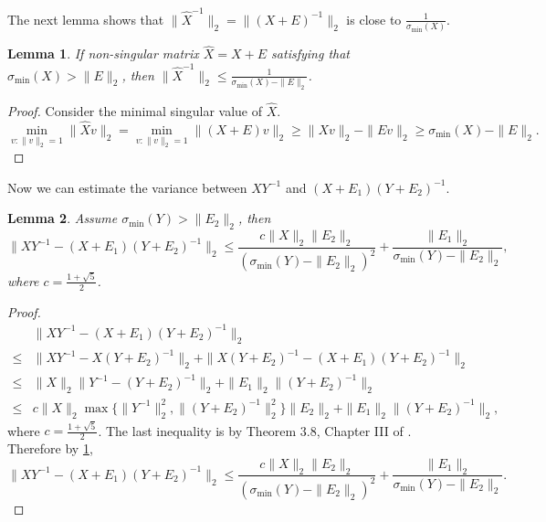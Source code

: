 \documentclass[english]{article} %
\newtheorem{lemma}{Lemma}[section]
\theoremstyle{definition}
\begin{document}
The next lemma shows that $\|\widehat{X}^{-1}\|_2 = \|(X+E)^{-1}\|_2$ is close to $\frac{1}{\sigma_{\min}(X)}$.

\begin{lemma}
\label{lem:inversevariation}
If non-singular matrix $\widehat{X} = X+E$ satisfying that $\sigma_{\min}(X)>\|E\|_2$, then  $\|\widehat{X}^{-1}\|_2 \le \frac{1}{\sigma_{\min}(X)-\|E\|_2}$.
\end{lemma} 
\begin{proof}
Consider the minimal singular value of $\widehat{X}$. 
\[
 \min_{v:\|v\|_2=1} \|\widehat{X}v\|_2 = \min_{v:\|v\|_2=1}\|(X+E)v\|_2 \ge \|Xv\|_2 - \|Ev\|_2 \ge \sigma_{\min}(X) - \|E\|_2.
\]
\end{proof}

Now we can estimate the variance between $XY^{-1}$ and $(X+E_1)(Y+E_2)^{-1}$.
\begin{lemma}
\label{lem:Mvariation}
Assume $\sigma_{\min}(Y) > \|E_2\|_2$, then 
\[
\| XY^{-1} - (X+E_1)(Y+E_2)^{-1}\|_2 \le \frac{c\|X\|_2\|E_2\|_2}{(\sigma_{\min}(Y) - \|E_2\|_2)^2}+\frac{\|E_1\|_2}{\sigma_{\min}(Y) - \|E_2\|_2},
\]
where $c = \frac{1+\sqrt{5}}{2}$.
\end{lemma}
\begin{proof}

\begin{align*}
	& \| XY^{-1} - (X+E_1)(Y+E_2)^{-1}\|_2 \\
\le & \| XY^{-1} - X(Y+E_2)^{-1}\|_2 + \| X(Y+E_2)^{-1} - (X+E_1)(Y+E_2)^{-1}\|_2 \\
\le & \|X\|_2\| Y^{-1} - (Y+E_2)^{-1}\|_2 + \| E_1\|_2 \|(Y+E_2)^{-1}\|_2 \\
\le & c \|X\|_2 \max\{\| Y^{-1}\|^2_2 , \|(Y+E_2)^{-1}\|^2_2\} \|E_2\|_2 + \| E_1\|_2 \|(Y+E_2)^{-1}\|_2,
\end{align*}
where $c = \frac{1+\sqrt{5}}{2}$. The last inequality is by Theorem 3.8, Chapter III of \citep*{stewart1990matrix}. Therefore by \cref{lem:inversevariation},
\[
\| XY^{-1} - (X+E_1)(Y+E_2)^{-1}\|_2 \le \frac{c\|X\|_2\|E_2\|_2}{(\sigma_{\min}(Y) - \|E_2\|_2)^2}+\frac{\|E_1\|_2}{\sigma_{\min}(Y) - \|E_2\|_2}.
\]
\end{proof}
\end{document}
